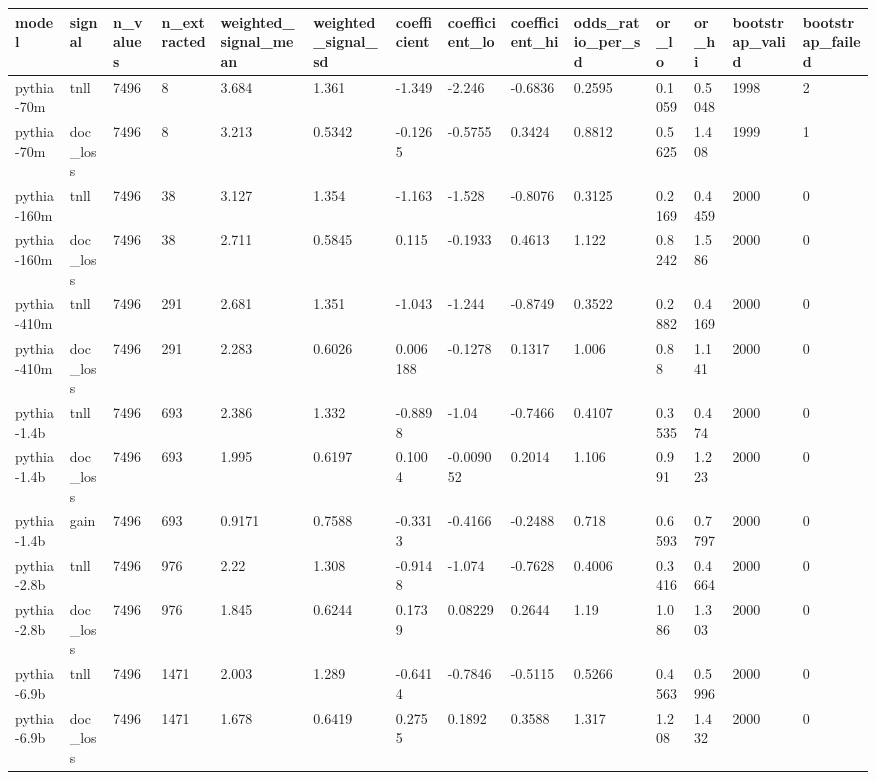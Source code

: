 \begin{tabular}{llllllllllllll}
\toprule
model & signal & n\_values & n\_extracted & weighted\_signal\_mean & weighted\_signal\_sd & coefficient & coefficient\_lo & coefficient\_hi & odds\_ratio\_per\_sd & or\_lo & or\_hi & bootstrap\_valid & bootstrap\_failed \\
\midrule
pythia-70m & tnll & 7496 & 8 & 3.684 & 1.361 & -1.349 & -2.246 & -0.6836 & 0.2595 & 0.1059 & 0.5048 & 1998 & 2 \\
pythia-70m & doc\_loss & 7496 & 8 & 3.213 & 0.5342 & -0.1265 & -0.5755 & 0.3424 & 0.8812 & 0.5625 & 1.408 & 1999 & 1 \\
pythia-160m & tnll & 7496 & 38 & 3.127 & 1.354 & -1.163 & -1.528 & -0.8076 & 0.3125 & 0.2169 & 0.4459 & 2000 & 0 \\
pythia-160m & doc\_loss & 7496 & 38 & 2.711 & 0.5845 & 0.115 & -0.1933 & 0.4613 & 1.122 & 0.8242 & 1.586 & 2000 & 0 \\
pythia-410m & tnll & 7496 & 291 & 2.681 & 1.351 & -1.043 & -1.244 & -0.8749 & 0.3522 & 0.2882 & 0.4169 & 2000 & 0 \\
pythia-410m & doc\_loss & 7496 & 291 & 2.283 & 0.6026 & 0.006188 & -0.1278 & 0.1317 & 1.006 & 0.88 & 1.141 & 2000 & 0 \\
pythia-1.4b & tnll & 7496 & 693 & 2.386 & 1.332 & -0.8898 & -1.04 & -0.7466 & 0.4107 & 0.3535 & 0.474 & 2000 & 0 \\
pythia-1.4b & doc\_loss & 7496 & 693 & 1.995 & 0.6197 & 0.1004 & -0.009052 & 0.2014 & 1.106 & 0.991 & 1.223 & 2000 & 0 \\
pythia-1.4b & gain & 7496 & 693 & 0.9171 & 0.7588 & -0.3313 & -0.4166 & -0.2488 & 0.718 & 0.6593 & 0.7797 & 2000 & 0 \\
pythia-2.8b & tnll & 7496 & 976 & 2.22 & 1.308 & -0.9148 & -1.074 & -0.7628 & 0.4006 & 0.3416 & 0.4664 & 2000 & 0 \\
pythia-2.8b & doc\_loss & 7496 & 976 & 1.845 & 0.6244 & 0.1739 & 0.08229 & 0.2644 & 1.19 & 1.086 & 1.303 & 2000 & 0 \\
pythia-6.9b & tnll & 7496 & 1471 & 2.003 & 1.289 & -0.6414 & -0.7846 & -0.5115 & 0.5266 & 0.4563 & 0.5996 & 2000 & 0 \\
pythia-6.9b & doc\_loss & 7496 & 1471 & 1.678 & 0.6419 & 0.2755 & 0.1892 & 0.3588 & 1.317 & 1.208 & 1.432 & 2000 & 0 \\
\bottomrule
\end{tabular}
